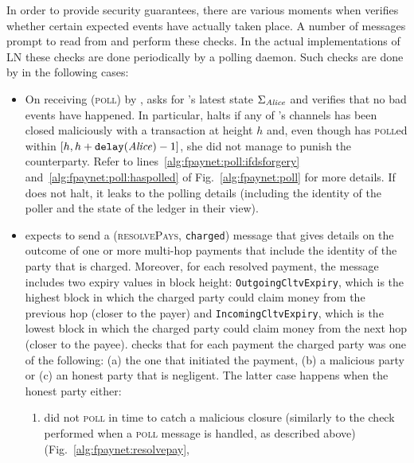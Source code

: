   In order to provide security guarantees, there are various moments when
  \fpaynet{} verifies whether certain expected events have actually taken place.
  A number of messages prompt \fpaynet{} to read from \ledger{} and perform
  these checks. In the actual implementations of LN these checks are done
  periodically by a polling daemon. Such checks are done by \fpaynet{} in the
  following cases:
  \begin{itemize}
    \item On receiving (\textsc{poll}) by \alice, \fpaynet{} asks \ledger{} for
    \alice's latest state $\Sigma_{\mathit{Alice}}$ and verifies that no bad events have
    happened. In particular, \fpaynet{} halts if any of \alice's channels has
    been closed maliciously with a transaction at height $h$ and, even though
    \alice{} has \textsc{poll}ed within $[h, h + \mathtt{delay}(\mathit{Alice}) - 1]$,
    she did not manage to punish the counterparty. Refer to
    lines~\ref{alg:fpaynet:poll:ifdsforgery}
    and~\ref{alg:fpaynet:poll:haspolled} of Fig.~\ref{alg:fpaynet:poll} for more
    details. If \fpaynet{} does not halt, it leaks to \simulator{} the polling
    details (including the identity of the poller and the state of the ledger in
    their view).
    \item \fpaynet{} expects \simulator{} to send a (\textsc{resolvePays},
    \texttt{charged}) message that gives details on the outcome of one or more
    multi-hop payments that include the identity of the party that is charged.
    Moreover, for each resolved payment, the message includes two expiry values
    in block height: \texttt{OutgoingCltvExpiry}, which is the highest block in
    which the charged party could claim money from the previous hop (closer to
    the payer) and \texttt{IncomingCltvExpiry}, which is the lowest block in
    which the charged party could claim money from the next hop (closer to the
    payee). \fpaynet{} checks that for each payment the charged party was one of
    the following: (a) the one that initiated the payment, (b) a malicious party
    or (c) an honest party that is negligent. The latter case happens when the
    honest party either:
    \begin{enumerate}
      \item did not \textsc{poll} in time to catch a malicious closure
      (similarly to the check performed when a \textsc{poll} message is handled,
      as described above) (Fig.~\ref{alg:fpaynet:resolvepay},

\end{enumerate}
\end{itemize}
